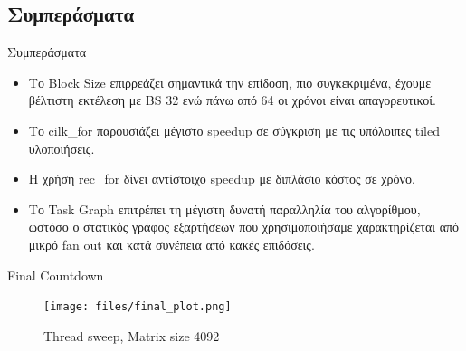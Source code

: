 \documentclass{beamer}
\begin{document}
\subsection{Συμπεράσματα}
\begin{frame}{Συμπεράσματα}
    \begin{itemize}
            \item<1-> Το Block Size επιρρεάζει σημαντικά την επίδοση, πιο
                συγκεκριμένα, έχουμε βέλτιστη εκτέλεση με BS 32 ενώ πάνω από
                64 οι χρόνοι είναι απαγορευτικοί.
            \item<2-> Το cilk\_for παρουσιάζει μέγιστο speedup σε σύγκριση με
                τις υπόλοιπες tiled υλοποιήσεις.
            \item<3-> Η χρήση rec\_for δίνει αντίστοιχο speedup με διπλάσιο
                κόστος σε χρόνο.
            \item<4-> Το Task Graph επιτρέπει τη μέγιστη δυνατή παραλληλία του
                αλγορίθμου, ωστόσο ο στατικός γράφος εξαρτήσεων που
                χρησιμοποιήσαμε χαρακτηρίζεται από μικρό fan out και κατά
                συνέπεια από κακές επιδόσεις.
    \end{itemize}
\end{frame}

\begin{frame}
    \begin{block}{Final Countdown}
        \begin{figure}[H]
            \centering
            \texttt{[image: files/final\_plot.png]}
            \caption{Thread sweep, Matrix size 4092}
        \end{figure}
    \end{block}
\end{frame}
\end{document}

